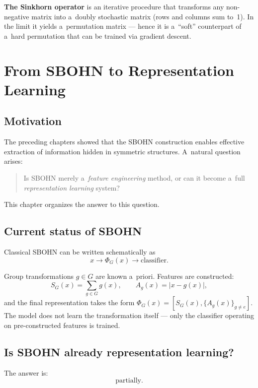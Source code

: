 \documentclass[11pt,a4paper]{report}
\begin{document}
\textbf{The Sinkhorn operator} is an iterative procedure that transforms any non-negative matrix into a~doubly stochastic matrix (rows and columns sum to~1). In the limit it yields a~permutation matrix --- hence it is a~``soft'' counterpart of a~hard permutation that can be trained via gradient descent.


\section{From SBOHN to Representation Learning}\label{sec:repr_learning}

\subsection{Motivation}

The preceding chapters showed that the SBOHN construction enables effective extraction of information hidden in symmetric structures. A~natural question arises:

\begin{quote}
Is SBOHN merely a~\emph{feature engineering} method, or can it become a~full \emph{representation learning} system?
\end{quote}

This chapter organizes the answer to this question.

\subsection{Current status of SBOHN}

Classical SBOHN can be written schematically as
\[
x
\longrightarrow
\Phi_G(x)
\longrightarrow
\text{classifier}.
\]

Group transformations $g\in G$ are known a~priori. Features are constructed:
\[
S_G(x)=\sum_{g\in G}g(x),\qquad
A_g(x)=|x-g(x)|,
\]
and the final representation takes the form $\Phi_G(x)=[S_G(x),\{A_g(x)\}_{g\neq e}]$. The model does not learn the transformation itself --- only the classifier operating on pre-constructed features is trained.

\subsection{Is SBOHN already representation learning?}

The answer is:
\[
\boxed{\text{partially.}}
\]
\end{document}
